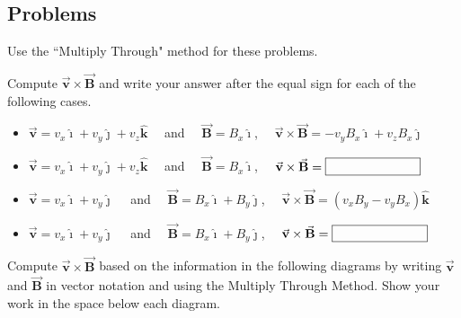 \documentclass{article}
\newcommand{\ihat}[0]{\hat{\boldsymbol{\imath}}}
\newcommand{\jhat}[0]{\hat{\boldsymbol{\jmath}}}
\newcommand{\khat}[0]{\hat{\boldsymbol{k}}}
\newcommand{\bfvec}[1]{\vec{\mathbf{#1}}}
\begin{document}
\ifsolutions

\else

\newpage
\fi

\subsection{Problems}

Use the ``Multiply Through" method for these problems.

Compute $\bfvec{v}\times\bfvec{B}$ and write your answer after the equal sign for each of the following cases.

\ifsolutions
    \begin{itemize}

      \item $\bfvec{v}=v_x\ihat+v_y\jhat+v_z\khat\quad$ and $\quad\bfvec{B}=B_x\ihat$, $\quad\bfvec{v}\times\bfvec{B} = \boxed{-v_yB_x\ihat+v_zB_x\jhat}$

    \end{itemize}
\else
\vskip 48pt

    \begin{itemize}

      \item $\bfvec{v}=v_x\ihat+v_y\jhat+v_z\khat\quad$ and $\quad\bfvec{B}=B_x\ihat$, $\quad\bfvec{v}\times\bfvec{B} = \fbox{\qquad\qquad\qquad\phantom M}$

    \end{itemize}
\fi

\ifsolutions
    \begin{itemize}

      \item $\bfvec{v}=v_x\ihat+v_y\jhat\quad$ and $\quad\bfvec{B}=B_x\ihat+B_y\jhat$, $\quad\bfvec{v}\times\bfvec{B} = \boxed{(v_xB_y-v_yB_x)\khat}$

    \end{itemize}
\else
\vskip 48pt

    \begin{itemize}

      \item $\bfvec{v}=v_x\ihat+v_y\jhat\quad$ and $\quad\bfvec{B}=B_x\ihat+B_y\jhat$, $\quad\bfvec{v}\times\bfvec{B} = \fbox{\qquad\qquad\qquad\phantom M}$

    \end{itemize}
\fi

\vskip 0.75pt

Compute $\bfvec{v}\times\bfvec{B}$ based on the information in the following diagrams by writing $\bfvec{v}$ and $\bfvec{B}$ in vector notation and using the Multiply Through Method. Show your work in the space below each diagram.
\end{document}
